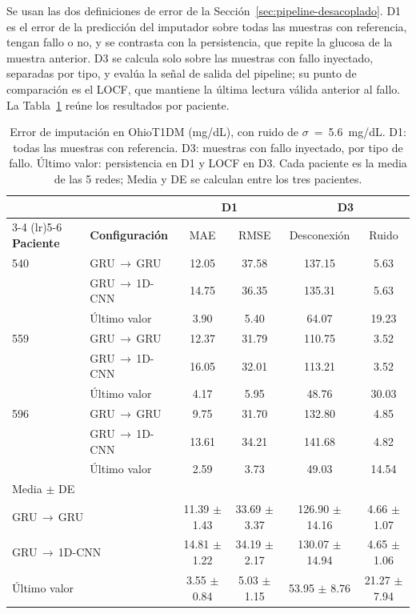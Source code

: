 \documentclass{report}
\begin{document}
Se usan las dos definiciones de error de la Sección~\ref{sec:pipeline-desacoplado}. D1 es el error de la predicción del imputador sobre todas las muestras con referencia, tengan fallo o no, y se contrasta con la persistencia, que repite la glucosa de la muestra anterior. D3 se calcula solo sobre las muestras con fallo inyectado, separadas por tipo, y evalúa la señal de salida del pipeline; su punto de comparación es el LOCF, que mantiene la última lectura válida anterior al fallo. La Tabla~\ref{tab:ohio_imputacion} reúne los resultados por paciente.
 
\begin{table}[H]
\centering
\footnotesize
\setlength{\tabcolsep}{5pt}
\caption{Error de imputación en OhioT1DM (mg/dL), con ruido de $\sigma$~=~5.6~mg/dL. D1: todas las muestras con referencia. D3: muestras con fallo inyectado, por tipo de fallo. Último valor: persistencia en D1 y LOCF en D3. Cada paciente es la media de las 5 redes; Media y DE se calculan entre los tres pacientes.}
\label{tab:ohio_imputacion}
\begin{tabular}{llcccc}
\toprule
& & \multicolumn{2}{c}{\textbf{D1}} & \multicolumn{2}{c}{\textbf{D3}} \\
\cmidrule(lr){3-4} \cmidrule(lr){5-6}
\textbf{Paciente} & \textbf{Configuración} & MAE & RMSE & Desconexión & Ruido \\
\midrule
540 & GRU\,$\rightarrow$\,GRU    & 12.05 & 37.58 & 137.15 & 5.63 \\
    & GRU\,$\rightarrow$\,1D-CNN & 14.75 & 36.35 & 135.31 & 5.63 \\
    & Último valor               &  3.90 &  5.40 &  64.07 & 19.23 \\
\midrule
559 & GRU\,$\rightarrow$\,GRU    & 12.37 & 31.79 & 110.75 & 3.52 \\
    & GRU\,$\rightarrow$\,1D-CNN & 16.05 & 32.01 & 113.21 & 3.52 \\
    & Último valor               &  4.17 &  5.95 &  48.76 & 30.03 \\
\midrule
596 & GRU\,$\rightarrow$\,GRU    &  9.75 & 31.70 & 132.80 & 4.85 \\
    & GRU\,$\rightarrow$\,1D-CNN & 13.61 & 34.21 & 141.68 & 4.82 \\
    & Último valor               &  2.59 &  3.73 &  49.03 & 14.54 \\
\midrule
\multicolumn{2}{l}{Media $\pm$ DE} & & & & \\
\multicolumn{2}{l}{\quad GRU\,$\rightarrow$\,GRU}    & 11.39 $\pm$ 1.43 & 33.69 $\pm$ 3.37 & 126.90 $\pm$ 14.16 & 4.66 $\pm$ 1.07 \\
\multicolumn{2}{l}{\quad GRU\,$\rightarrow$\,1D-CNN} & 14.81 $\pm$ 1.22 & 34.19 $\pm$ 2.17 & 130.07 $\pm$ 14.94 & 4.65 $\pm$ 1.06 \\
\multicolumn{2}{l}{\quad Último valor}               & 3.55 $\pm$ 0.84  & 5.03 $\pm$ 1.15  & 53.95 $\pm$ 8.76   & 21.27 $\pm$ 7.94 \\
\bottomrule
\end{tabular}
\end{table}
 
\end{document}
